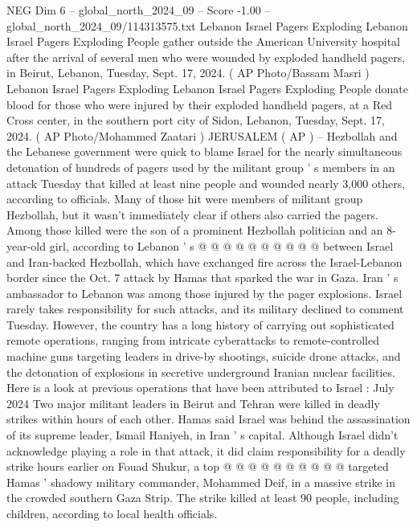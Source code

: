 \begin{textsample}{NEG Dim 6 – global\_north\_2024\_09 – Score -1.00 – global\_north\_2024\_09/114313575.txt}  \label{ex:f6_neg_094}
Lebanon Israel Pagers Exploding Lebanon Israel Pagers Exploding People gather outside the American University hospital after the arrival of several men who were wounded by exploded handheld pagers, in Beirut, Lebanon, Tuesday, Sept. 17, 2024. ( AP Photo/Bassam Masri ) Lebanon Israel Pagers Exploding Lebanon Israel Pagers Exploding People donate blood for those who were injured by their exploded handheld pagers, at a Red Cross center, in the southern port city of Sidon, Lebanon, Tuesday, Sept. 17, 2024. ( AP Photo/Mohammed Zaatari ) JERUSALEM ( AP ) -- Hezbollah and the Lebanese government were quick to blame Israel for the nearly simultaneous detonation of hundreds of pagers used by the militant group ' s members in an attack Tuesday that killed at least nine people and wounded nearly 3,000 others, according to officials.
Many of those hit were members of militant group Hezbollah, but it wasn't immediately clear if others also carried the pagers.
Among those killed were the son of a prominent Hezbollah politician and an 8-year-old girl, according to Lebanon ' s @ @ @ @ @ @ @ @ @ @ between Israel and Iran-backed Hezbollah, which have exchanged fire across the Israel-Lebanon border since the Oct. 7 attack by Hamas that sparked the war in Gaza.
Iran ' s ambassador to Lebanon was among those injured by the pager explosions.
Israel rarely takes responsibility for such attacks, and its military declined to comment Tuesday.
However, the country has a long history of carrying out sophisticated remote operations, ranging from intricate cyberattacks to remote-controlled machine guns targeting leaders in drive-by shootings, suicide drone attacks, and the detonation of explosions in secretive underground Iranian nuclear facilities.
Here is a look at previous operations that have been attributed to Israel : July 2024 Two major militant leaders in Beirut and Tehran were killed in deadly strikes within hours of each other.
Hamas said Israel was behind the assassination of its supreme leader, Ismail Haniyeh, in Iran ' s capital.
Although Israel didn't acknowledge playing a role in that attack, it did claim responsibility for a deadly strike hours earlier on Fouad Shukur, a top @ @ @ @ @ @ @ @ @ @ targeted Hamas ' shadowy military commander, Mohammed Deif, in a massive strike in the crowded southern Gaza Strip.
The strike killed at least 90 people, including children, according to local health officials.

\end{textsample}
